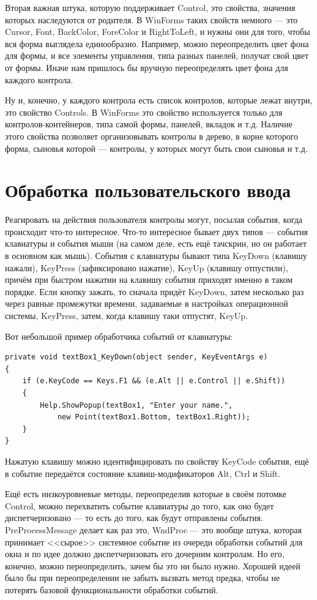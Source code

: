 \documentclass[a5paper]{article}
\begin{document}
Вторая важная штука, которую поддерживает Control, это свойства, значения которых наследуются от родителя. В WinForms таких свойств немного --- это Cursor, Font, BackColor, ForeColor и RightToLeft, и нужны они для того, чтобы вся форма выглядела единообразно. Например, можно переопределить цвет фона для формы, и все элементы управления, типа разных панелей, получат свой цвет от формы. Иначе нам пришлось бы вручную переопределять цвет фона для каждого контрола.

Ну и, конечно, у каждого контрола есть список контролов, которые лежат внутри, это свойство Controls. В WinForms это свойство используется только для контролов-контейнеров, типа самой формы, панелей, вкладок и т.д. Наличие этого свойства позволяет организовывать контролы в дерево, в корне которого форма, сыновья которой --- контролы, у которых могут быть свои сыновья и т.д.

\section{Обработка пользовательского ввода}

Реагировать на действия пользователя контролы могут, посылая события, когда происходит что-то интересное. Что-то интересное бывает двух типов --- события клавиатуры и события мыши (на самом деле, есть ещё тачскрин, но он работает в основном как мышь). События с клавиатуры бывают типа KeyDown (клавишу нажали), KeyPress (зафиксировано нажатие), KeyUp (клавишу отпустили), причём при быстром нажатии на клавишу события приходят именно в таком порядке. Если кнопку зажать, то сначала придёт KeyDown, затем несколько раз через равные промежутки времени, задаваемые в настройках операционной системы, KeyPress, затем, когда клавишу таки отпустят, KeyUp. 

Вот небольшой пример обработчика событий от клавиатуры: 

\begin{verbatim}
private void textBox1_KeyDown(object sender, KeyEventArgs e)
{
    if (e.KeyCode == Keys.F1 && (e.Alt || e.Control || e.Shift))
    {
        Help.ShowPopup(textBox1, "Enter your name.", 
            new Point(textBox1.Bottom, textBox1.Right));
    }
}
\end{verbatim}

Нажатую клавишу можно идентифицировать по свойству KeyCode события, ещё в событие передаётся состояние клавиш-модификаторов Alt, Ctrl и Shift. 

Ещё есть низкоуровневые методы, переопределив которые в своём потомке Control, можно перехватить событие клавиатуры до того, как оно будет диспетчеризовано --- то есть до того, как будут отправлены события. PreProcessMessage делает как раз это, WndProc --- это вообще штука, которая принимает <<сырое>> системное событие из очереди обработки событий для окна и по идее должно диспетчеризовать его дочерним контролам. Но его, конечно, можно переопределить, зачем бы это ни было нужно. Хорошей идеей было бы при переопределении не забыть вызвать метод предка, чтобы не потерять базовой функциональности обработки событий.
\end{document}
